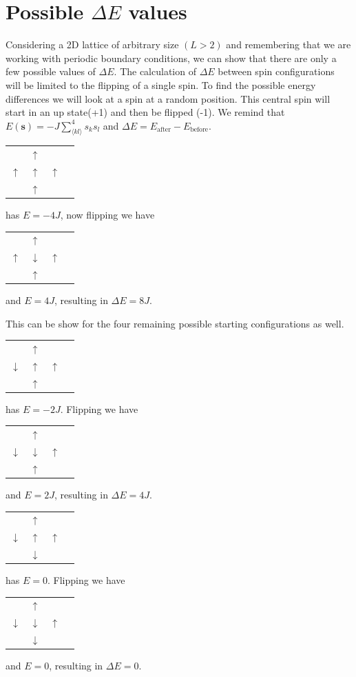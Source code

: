 \documentclass[english,notitlepage,reprint,nofootinbib]{revtex4-1}  %
\begin{document}
\section{Possible $\Delta E$ values}\label{appendix:B}
Considering a 2D lattice of arbitrary size $(L>2)$ and remembering that we are working with periodic boundary conditions, we can show that there are only a few possible values of $\Delta E$. The calculation of $\Delta E$ between spin configurations will be limited to the flipping of a single spin. To find the possible energy differences we will look at a spin at a random position. This central spin will start in an up state(+1) and then be flipped (-1). We remind that $ E(\textbf{s}) = - J \sum^4_{\langle kl \rangle} s_k s_l$ and $ \Delta E = E_{\text{after}} - E_{\text{before}}$.
\begin{table}[H]
\begin{tabular}{llll}
   & $\uparrow$ &    \\
$\uparrow$ & $\uparrow$ & $\uparrow$ \\
   & $\uparrow$ &  
\end{tabular}
has $E = -4J$, now flipping we have 
\begin{tabular}{llll}
    & $\uparrow$ &    \\
 $\uparrow$ & $\downarrow$ & $\uparrow$ \\
    & $\uparrow$ &  
 \end{tabular}
 and $E = 4J$, resulting in $\Delta E = 8J$.
\end{table}
This can be show for the four remaining possible starting configurations as well.
\begin{table}[H]
    \begin{tabular}{llll}
       & $\uparrow$ &    \\
    $\downarrow$ & $\uparrow$ & $\uparrow$ \\
       & $\uparrow$ &  
    \end{tabular}
    has $E = -2J$. Flipping we have 
    \begin{tabular}{llll}
        & $\uparrow$ &    \\
     $\downarrow$ & $\downarrow$ & $\uparrow$ \\
        & $\uparrow$ &  
     \end{tabular}
     and $E = 2J$, resulting in $\Delta E = 4J$.
\end{table}
    
\begin{table}[H]
    \begin{tabular}{llll}
       & $\uparrow$ &    \\
    $\downarrow$ & $\uparrow$ & $\uparrow$ \\
       & $\downarrow$ &  
    \end{tabular}
    has $E = 0$. Flipping we have 
    \begin{tabular}{llll}
        & $\uparrow$ &    \\
     $\downarrow$ & $\downarrow$ & $\uparrow$ \\
        & $\downarrow$ &  
     \end{tabular}
     and $E = 0$, resulting in $\Delta E = 0$.
\end{table}
\end{document}
